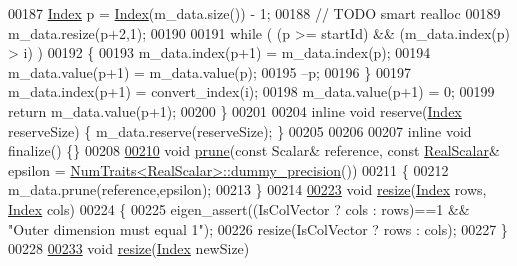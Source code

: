 \begin{DoxyCode}
00187       \hyperlink{group___core___module_a554f30542cc2316add4b1ea0a492ff02}{Index} p = \hyperlink{namespace_eigen_a62e77e0933482dafde8fe197d9a2cfde}{Index}(m\_data.size()) - 1;
00188       \textcolor{comment}{// TODO smart realloc}
00189       m\_data.resize(p+2,1);
00190 
00191       \textcolor{keywordflow}{while} ( (p >= startId) && (m\_data.index(p) > i) )
00192       \{
00193         m\_data.index(p+1) = m\_data.index(p);
00194         m\_data.value(p+1) = m\_data.value(p);
00195         --p;
00196       \}
00197       m\_data.index(p+1) = convert\_index(i);
00198       m\_data.value(p+1) = 0;
00199       \textcolor{keywordflow}{return} m\_data.value(p+1);
00200     \}
00201 
00204     \textcolor{keyword}{inline} \textcolor{keywordtype}{void} reserve(\hyperlink{group___core___module_a554f30542cc2316add4b1ea0a492ff02}{Index} reserveSize) \{ m\_data.reserve(reserveSize); \}
00205 
00206 
00207     \textcolor{keyword}{inline} \textcolor{keywordtype}{void} finalize() \{\}
00208 
\hyperlink{group___sparse_core___module_af094e30271da69f865b5d97f338f81d1}{00210}     \textcolor{keywordtype}{void} \hyperlink{group___sparse_core___module_af094e30271da69f865b5d97f338f81d1}{prune}(\textcolor{keyword}{const} Scalar& reference, \textcolor{keyword}{const} \hyperlink{group___sparse_core___module_aaec8ace6efb785c81d442931c3248d88}{RealScalar}& epsilon = 
      \hyperlink{group___core___module_struct_eigen_1_1_num_traits}{NumTraits<RealScalar>::dummy\_precision}())
00211     \{
00212       m\_data.prune(reference,epsilon);
00213     \}
00214 
\hyperlink{group___sparse_core___module_a2dc842b3bb2ba3692e210565c48aff3c}{00223}     \textcolor{keywordtype}{void} \hyperlink{group___sparse_core___module_a2dc842b3bb2ba3692e210565c48aff3c}{resize}(\hyperlink{group___core___module_a554f30542cc2316add4b1ea0a492ff02}{Index} rows, \hyperlink{group___core___module_a554f30542cc2316add4b1ea0a492ff02}{Index} cols)
00224     \{
00225       eigen\_assert((IsColVector ? cols : rows)==1 && \textcolor{stringliteral}{"Outer dimension must equal 1"});
00226       resize(IsColVector ? rows : cols);
00227     \}
00228 
\hyperlink{group___sparse_core___module_a1020011c75fb70b21257c8d04ee07514}{00233}     \textcolor{keywordtype}{void} \hyperlink{group___sparse_core___module_a1020011c75fb70b21257c8d04ee07514}{resize}(\hyperlink{group___core___module_a554f30542cc2316add4b1ea0a492ff02}{Index} newSize)

\end{DoxyCode}
